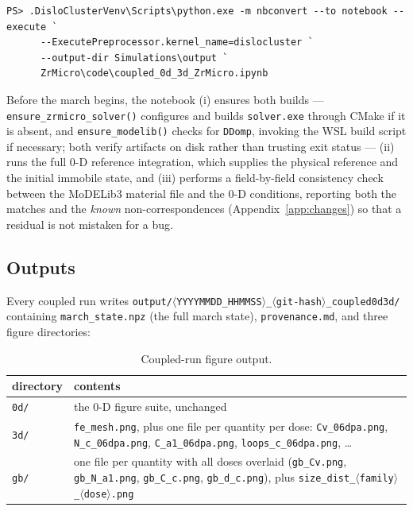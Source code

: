 \documentclass[11pt]{article}
\newcommand{\MoD}{\textsf{MoDELib3}}
\newcommand{\code}[1]{\texttt{\small #1}}
\newcommand{\file}[1]{\texttt{\footnotesize #1}}
\begin{document}
\begin{lstlisting}[style=ps]
PS> .DisloClusterVenv\Scripts\python.exe -m nbconvert --to notebook --execute `
      --ExecutePreprocessor.kernel_name=dislocluster `
      --output-dir Simulations\output `
      ZrMicro\code\coupled_0d_3d_ZrMicro.ipynb
\end{lstlisting}

Before the march begins, the notebook (i) ensures both builds ---
\code{ensure\_zrmicro\_solver()} configures and builds \file{solver.exe}
through CMake if it is absent, and \code{ensure\_modelib()} checks for
\code{DDomp}, invoking the WSL build script if necessary; both verify
artifacts on disk rather than trusting exit status --- (ii) runs the full
0-D reference integration, which supplies the physical reference and the
initial immobile state, and (iii) performs a field-by-field consistency check
between the \MoD{} material file and the 0-D conditions, reporting both the
matches and the \emph{known} non-correspondences
(Appendix~\ref{app:changes}) so that a residual is not mistaken for a bug.

\subsection{Outputs}

Every coupled run writes
\file{output/$\langle$YYYYMMDD\_HHMMSS$\rangle$\_$\langle$git-hash$\rangle$\_coupled0d3d/}
containing \file{march\_state.npz} (the full march state), \file{provenance.md},
and three figure directories:

\begin{table}[htbp]
\centering
\caption{Coupled-run figure output.}
\label{tab:coupledout}
\begin{tabular}{@{}lp{}@{}}
\toprule
directory & contents \\
\midrule
\file{0d/} & the 0-D figure suite, unchanged \\
\file{3d/} & \file{fe\_mesh.png}, plus one file per quantity per dose:
\file{Cv\_06dpa.png}, \file{N\_c\_06dpa.png}, \file{C\_a1\_06dpa.png},
\file{loops\_c\_06dpa.png}, \ldots \\
\file{gb/} & one file per quantity with all doses overlaid
(\file{gb\_Cv.png}, \file{gb\_N\_a1.png}, \file{gb\_C\_c.png},
\file{gb\_d\_c.png}), plus \file{size\_dist\_$\langle$family$\rangle$\_$\langle$dose$\rangle$.png} \\
\bottomrule
\end{tabular}
\end{table}
\end{document}

